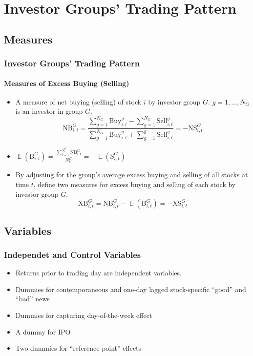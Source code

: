 \documentclass{beamer}
\DeclareMathOperator{\E}{\mathbb{E}} %
\begin{document}
\section{Investor Groups' Trading Pattern}


\subsection*{Measures}


\begin{frame}
    \frametitle{Investor Groups' Trading Pattern}
    \framesubtitle{Measures of Excess Buying (Selling)}
    \begin{itemize}
        \item A measure of net buying (selling) of stock \(i\) by investor group \(G\). \(g = 1,\ldots,N_G\) is an investor in group \(G\).
              \[
                  \mathrm{NB}_{i, t}^{G} = \frac{\sum_{g=1}^{N_{G}} \mathrm{Buy}_{i, t}^{g}-\sum_{g=1}^{N_{G}} \mathrm{Sell}_{i, t}^{g}}{\sum_{g=1}^{N_{G}} \mathrm{Buy}_{i, t}^{g}+\sum_{g=1}^{g} \mathrm{Sell}_{i, t}^{g}} = - \mathrm{NS}_{i, t}^{G}
              \]
        \item \(\E(\mathrm{B}_{i,t}^G)=\frac{\sum_{i=1}^{N_{t}^{G}} \mathrm{NB}_{i, t}^{G}}{N_{t}^{G}} = - \E(\mathrm{S}_{i,t}^G)\)
        \item By adjusting for the group's average excess buying and selling of all stocks at time \(t\), define two measures for excess buying and selling of each stock by investor group \(G\).
              \[
                  \mathrm{XB}_{i, t}^{G} = \mathrm{NB}_{i, t}^{G} - \E(\mathrm{B}_{i,t}^G) = - \mathrm{XS}_{i, t}^{G}
              \]
    \end{itemize}
\end{frame}


\subsection*{Variables}


\begin{frame}
    \frametitle{Independet and Control Variables}
    \begin{itemize}
        \item Returns prior to trading day are independent variables.
        \item Dummies for contemporaneous and one-day lagged stock-specific ``good'' and ``bad'' news
        \item Dummies for capturing day-of-the-week effect
        \item A dummy for IPO
        \item Two dummies for ``reference point'' effects
    \end{itemize}
\end{frame}
\end{document}
